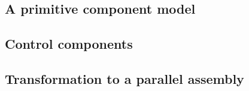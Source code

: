 \subsection{A primitive component model}

\subsection{Control components}

\subsection{Transformation to a parallel assembly}